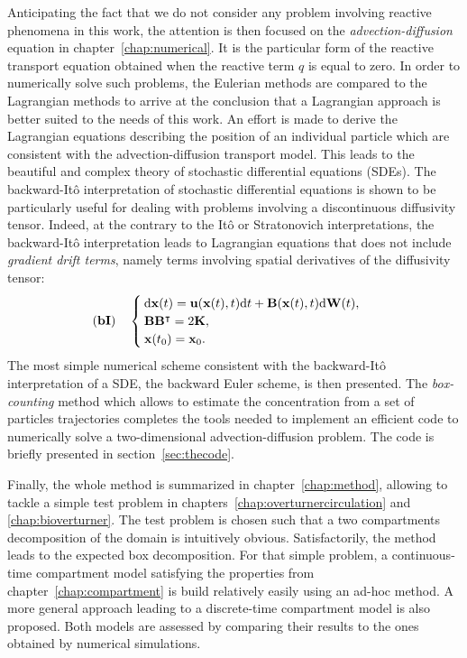 Anticipating the fact that we do not consider any problem involving reactive phenomena in this work, the attention is then focused on the \textit{advection-diffusion} equation in chapter~\ref{chap:numerical}. It is the particular form of the reactive transport equation obtained when the reactive term $q$ is equal to zero. In order to numerically solve such problems, the Eulerian methods are compared to the Lagrangian methods to arrive at the conclusion that a Lagrangian approach is better suited to the needs of this work. An effort is made to derive the Lagrangian equations describing the position of an individual particle which are consistent with the advection-diffusion transport model. This leads to the beautiful and complex theory of stochastic differential equations (SDEs). The backward-Itô interpretation of stochastic differential equations is shown to be particularly useful for dealing with problems involving a discontinuous diffusivity tensor. Indeed, at the contrary to the Itô or Stratonovich interpretations, the backward-Itô interpretation leads to Lagrangian equations that does not include \textit{gradient drift terms}, namely terms involving spatial derivatives of the diffusivity tensor:
\[  
	\mathbf{(bI)} \quad
	\begin{cases}
		\mathrm d \mathbf{x}(t) =  \mathbf u(\mathbf x(t),t) \mathrm dt + \mathbf B(\mathbf x(t),t) \mathrm d \mathbf W(t),\\
		\mathbf B \mathbf B^\intercal = 2 \mathbf K,\\
		\mathbf x(t_0) = \mathbf x_0.
	\end{cases}{}
\]
The most simple numerical scheme consistent with the backward-Itô interpretation of a SDE, the backward Euler scheme, is then presented. The \textit{box-counting} method which allows to estimate the concentration from a set of particles trajectories completes the tools needed to implement an efficient code to numerically solve a two-dimensional advection-diffusion problem. The code is briefly presented in section~\ref{sec:thecode}. 

Finally, the whole method is summarized in chapter~\ref{chap:method}, allowing to tackle a simple test problem in chapters~\ref{chap:overturnercirculation} and \ref{chap:bioverturner}. The test problem is chosen such that a two compartments decomposition of the domain is intuitively obvious. Satisfactorily, the method leads to the expected box decomposition. For that simple problem, a continuous-time compartment model satisfying the properties from chapter~\ref{chap:compartment} is build relatively easily using an ad-hoc method. A more general approach leading to a discrete-time compartment model is also proposed. Both models are assessed by comparing their results to the ones obtained by numerical simulations.

